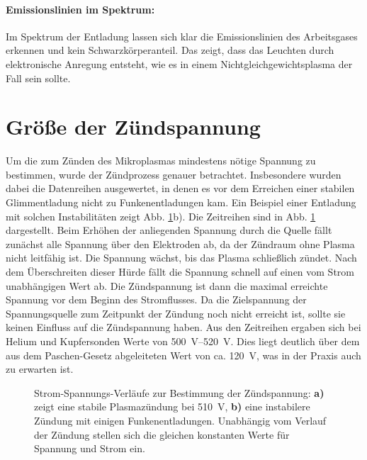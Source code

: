 \paragraph{Emissionslinien im Spektrum:}

Im Spektrum der Entladung lassen sich klar die Emissionslinien des Arbeitsgases erkennen und kein Schwarzkörperanteil. Das zeigt, dass das Leuchten durch elektronische Anregung entsteht, wie es in einem Nichtgleichgewichtsplasma der Fall sein sollte.

\section{Größe der Zündspannung}\label{sec:zuendspannung}

Um die zum Zünden des Mikroplasmas mindestens nötige Spannung zu bestimmen, wurde der Zündprozess genauer betrachtet. Insbesondere wurden dabei die Datenreihen ausgewertet, in denen es vor dem Erreichen einer stabilen Glimmentladung nicht zu Funkenentladungen kam. Ein Beispiel einer Entladung mit solchen Instabilitäten zeigt Abb. \ref{fig:zuendspannung}b). Die Zeitreihen sind in Abb. \ref{fig:zuendspannung} dargestellt. Beim Erhöhen der anliegenden Spannung durch die Quelle fällt zunächst alle Spannung über den Elektroden ab, da der Zündraum ohne Plasma nicht leitfähig ist. Die Spannung wächst, bis das Plasma schließlich zündet. Nach dem Überschreiten dieser Hürde fällt die Spannung schnell auf einen vom Strom unabhängigen Wert ab. Die Zündspannung ist dann die maximal erreichte Spannung vor dem Beginn des Stromflusses. Da die Zielspannung der Spannungsquelle zum Zeitpunkt der Zündung noch nicht erreicht ist, sollte sie keinen Einfluss auf die Zündspannung haben. %
Aus den Zeitreihen ergaben sich bei Helium und Kupfersonden Werte von \qtyrange{500}{520}{V}. Dies liegt deutlich über dem aus dem Paschen-Gesetz abgeleiteten Wert von ca. \qty{120}{V}, was in der Praxis auch zu erwarten ist.


\begin{figure}[h]
	\centering
	
	\caption{Strom-Spannungs-Verläufe zur Bestimmung der Zündspannung: \textbf{a)} zeigt eine stabile Plasmazündung bei \qty{510}{V}, \textbf{b)} eine instabilere Zündung mit einigen Funkenentladungen. Unabhängig vom Verlauf der Zündung stellen sich die gleichen konstanten Werte für Spannung und Strom ein.}
	\label{fig:zuendspannung}
\end{figure}



